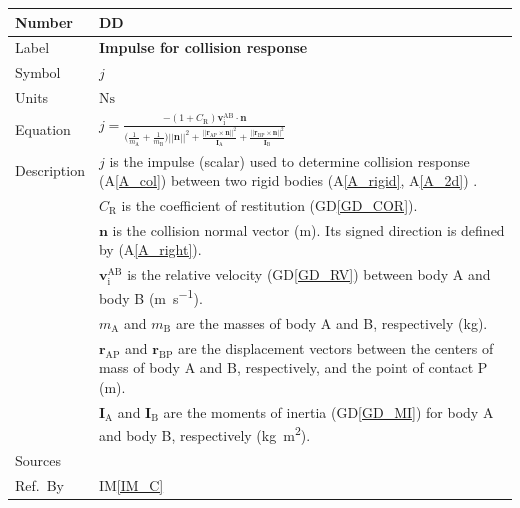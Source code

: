 \documentclass[12pt]{article}
\newcommand{\colAwidth}{0.13\textwidth}
\newcommand{\colBwidth}{0.82\textwidth}
\newcounter{defnum} %
\newcounter{datadefnum} %
\newcommand{\aref}[1]{A\ref{#1}}
\begin{document}
\noindent
\begin{minipage}{\textwidth}
	\renewcommand*{\arraystretch}{1.5}
	\begin{tabular}{| p{\colAwidth} | p{\colBwidth}|}
		\hline
		\rowcolor[gray]{0.9}
		Number& DD{datadefnum}\thedatadefnum \label{DD_IM}\\
		\hline
		Label& \bf Impulse for collision response \\
		\hline
		Symbol & $j$\\
		\hline
		Units & $\si{\newton\second}$\\
		\hline
		\rule{0pt}{22pt}Equation &$j = \displaystyle\frac{-(1 + C_\mathrm{R}) \mathbf{v}^\mathrm{AB}_\mathrm{i} \cdot \mathbf{n}}{\bigg(\displaystyle\frac{1}{m_\mathrm{A}} + \frac{1}{m_\mathrm{B}}\bigg)||\mathbf{n}||^2 + \displaystyle\frac{||\mathbf{r}_\mathrm{AP} \times \mathbf{n}||^2}{\mathbf{I}_\mathrm{A}} + \displaystyle\frac{||\mathbf{r}_\mathrm{BP} \times \mathbf{n}||^2}{\mathbf{I}_\mathrm{B}}}$\\
		\hline
		Description & 
		$j$ is the impulse (scalar) used to determine collision response (\aref{A_col}) between two rigid bodies (\aref{A_rigid}, \aref{A_2d}) . \\
		& $C_\mathrm{R}$ is the coefficient of restitution (GD\ref{GD_COR}). \\
		& $\mathbf{n}$ is the collision normal vector (\si{\metre}). Its signed direction is defined by (\aref{A_right}). \\
		& $\mathbf{v}^{\mathrm{AB}}_{\mathrm{i}}$ is the relative velocity (GD\ref{GD_RV}) between body A and body B (\si{\metre\per\second}). \\
		& $m_\mathrm{A}$ and $m_\mathrm{B}$ are the masses of body A and B, respectively (\si{\kilogram}). \\
		& $\mathbf{r}_\mathrm{AP}$ and $\mathbf{r}_\mathrm{BP}$ are the displacement vectors between the centers of mass of body A and B, respectively, and the point of contact P (\si{\metre}). \\
		& $\mathbf{I}_\mathrm{A}$ and $\mathbf{I}_\mathrm{B}$ are the moments of inertia (GD\ref{GD_MI}) for body A and body B, respectively (\si{\kilogram\metre\tothe{2}}). \\
		\hline
		Sources& \\
		\hline
		Ref.\ By & IM\ref{IM_C} \\
		\hline
	\end{tabular}
\end{minipage}
\end{document}
